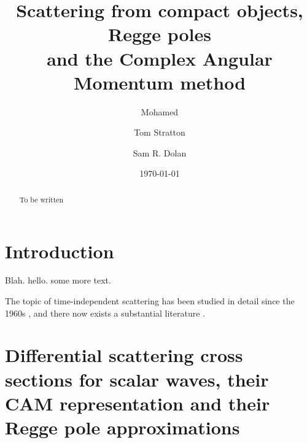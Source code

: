 \documentclass[aps,prd,longbibliography,reprint,twocolumn,amsmath,amssymb,amsfonts,showpacs,superscriptaddress]{revtex4-1}%
\begin{document}
\title{Scattering from compact objects, Regge poles \\ and the Complex Angular Momentum method}



\author{Mohamed }


%
\author{Tom Stratton}
%
\author{Sam R. Dolan}
%
\begin{abstract}
To be written
\end{abstract}

\date{\today}

\maketitle


\section{Introduction}
Blah. hello. some more text.

 The topic of time-independent scattering has been studied in detail since the 1960s \cite{Hildreth1964PhDT64, Matzner:1968, Vishveshwara:1970}, and there now exists a substantial literature \cite{Mashhoon:1973zz,Chrzanowski:1976jb,DeLogi:1977dp,Sanchez:1977vz,MatznerRyan1978,Handler:1980un,Matzner:1985rjn,Futterman:1988ni,Andersson:1995vi,Glampedakis:2001cx,Dolan:2006vj,Dolan:2007ut,Dolan:2008kf,Crispino:2009xt,Cotaescu:2014jca,Sorge:2015yoa,Gussmann:2016mkp,Leite:2017zyb,Nambu:2019sqn, Folacci:2019vtt,Leite:2019eis}.



\section{Differential scattering cross sections for scalar waves, their CAM representation and their Regge pole approximations}
\label{SecII}
\end{document}
